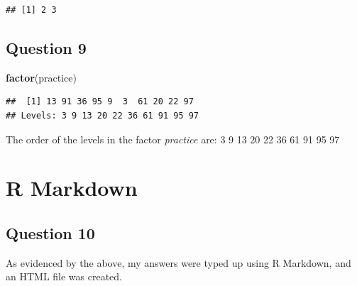 \documentclass[
  openany]{book}
\newenvironment{Shaded}{\begin{snugshade}}{\end{snugshade}}
\newcommand{\FunctionTok}[1]{\textcolor[rgb]{0.13,0.29,0.53}{\textbf{#1}}}
\newcommand{\NormalTok}[1]{#1}
\begin{document}
\begin{verbatim}
## [1] 2 3
\end{verbatim}

\subsection{Question 9}\label{question-9}

\begin{Shaded}
\begin{Highlighting}[]
\FunctionTok{factor}\NormalTok{(practice)}
\end{Highlighting}
\end{Shaded}

\begin{verbatim}
##  [1] 13 91 36 95 9  3  61 20 22 97
## Levels: 3 9 13 20 22 36 61 91 95 97
\end{verbatim}

The order of the levels in the factor \emph{practice} are:
3 9 13 20 22 36 61 91 95 97

\section{R Markdown}\label{r-markdown}

\subsection{Question 10}\label{question-10}

As evidenced by the above, my answers were typed up using R Markdown, and an HTML file was created.

  
\end{document}
